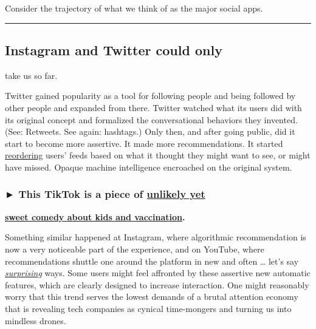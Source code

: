 Consider the trajectory of what we think of as the major social apps.

\begin{center}\rule{0.5\linewidth}{\linethickness}\end{center}

\hypertarget{instagram-and-twitter-could-only}{%
\subsection{Instagram and Twitter could
only}\label{instagram-and-twitter-could-only}}

take us so far.

Twitter gained popularity as a tool for following people and being
followed by other people and expanded from there. Twitter watched what
its users did with its original concept and formalized the
conversational behaviors they invented. (See: Retweets. See again:
hashtags.) Only then, and after going public, did it start to become
more assertive. It made more recommendations. It started
\href{https://www.vox.com/culture/2018/9/20/17876098/twitter-chronological-timeline-back-finally}{reordering}
users' feeds based on what it thought they might want to see, or might
have missed. Opaque machine intelligence encroached on the original
system.

\hypertarget{-this-tiktok-is-a-piece-of-unlikely-yet}{%
\subsubsection{\texorpdfstring{► \textbf{This TikTok is a piece of}
\textbf{\href{https://www.tiktok.com/share/video/6666104355344616710?refer=embed}{unlikely
yet}}}{► This TikTok is a piece of unlikely yet}}\label{-this-tiktok-is-a-piece-of-unlikely-yet}}

\textbf{\href{https://www.tiktok.com/share/video/6666104355344616710?refer=embed}{sweet
comedy about kids and vaccination}.}

Something similar happened at Instagram, where algorithmic
recommendation is now a very noticeable part of the experience, and on
YouTube, where recommendations shuttle one around the platform in new
and often \ldots{} let's say
\href{https://www.buzzfeednews.com/article/carolineodonovan/down-youtubes-recommendation-rabbithole}{\emph{surprising}}
ways. Some users might feel affronted by these assertive new automatic
features, which are clearly designed to increase interaction. One might
reasonably worry that this trend serves the lowest demands of a brutal
attention economy that is revealing tech companies as cynical
time-mongers and turning us into mindless drones.

